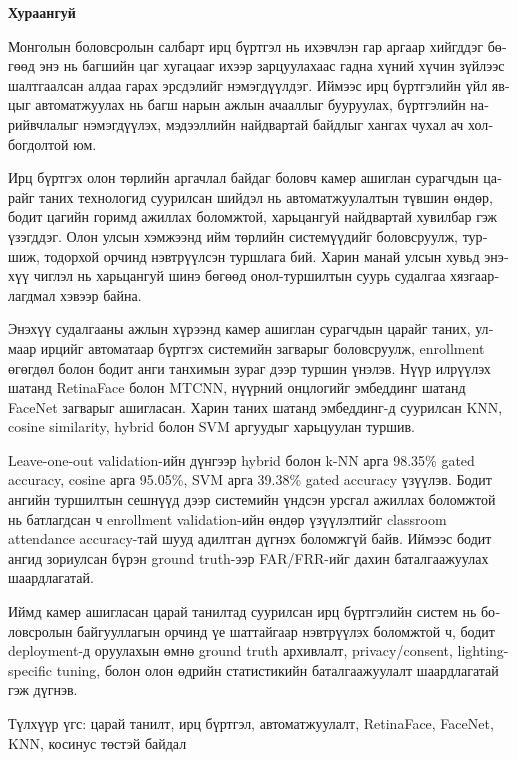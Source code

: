 \begin{otherlanguage}{mongolian}
\begin{center}
\textbf{\large Хураангуй}
\end{center}
\begin{justify}
Монголын боловсролын салбарт ирц бүртгэл нь ихэвчлэн гар аргаар хийгддэг бөгөөд энэ нь багшийн цаг хугацааг ихээр зарцуулахаас гадна хүний хүчин зүйлээс шалтгаалсан алдаа гарах эрсдэлийг нэмэгдүүлдэг. Иймээс ирц бүртгэлийн үйл явцыг автоматжуулах нь багш нарын ажлын ачааллыг бууруулах, бүртгэлийн нарийвчлалыг нэмэгдүүлэх, мэдээллийн найдвартай байдлыг хангах чухал ач холбогдолтой юм.

Ирц бүртгэх олон төрлийн аргачлал байдаг боловч камер ашиглан сурагчдын царайг таних технологид суурилсан шийдэл нь автоматжуулалтын түвшин өндөр, бодит цагийн горимд ажиллах боломжтой, харьцангуй найдвартай хувилбар гэж үзэгддэг. Олон улсын хэмжээнд ийм төрлийн системүүдийг боловсруулж, туршиж, тодорхой орчинд нэвтрүүлсэн туршлага бий. Харин манай улсын хувьд энэхүү чиглэл нь харьцангуй шинэ бөгөөд онол-туршилтын суурь судалгаа хязгаарлагдмал хэвээр байна.

Энэхүү судалгааны ажлын хүрээнд камер ашиглан сурагчдын царайг таних, улмаар ирцийг автоматаар бүртгэх системийн загварыг боловсруулж, enrollment өгөгдөл болон бодит анги танхимын зураг дээр туршин үнэлэв. Нүүр илрүүлэх шатанд RetinaFace болон MTCNN, нүүрний онцлогийг эмбеддинг шатанд FaceNet загварыг ашигласан. Харин таних шатанд эмбеддинг-д суурилсан KNN, cosine similarity, hybrid болон SVM аргуудыг харьцуулан туршив.

Leave-one-out validation-ийн дүнгээр hybrid болон k-NN арга 98.35\% gated accuracy, cosine арга 95.05\%, SVM арга 39.38\% gated accuracy үзүүлэв. Бодит ангийн туршилтын сешнүүд дээр системийн үндсэн урсгал ажиллах боломжтой нь батлагдсан ч enrollment validation-ийн өндөр үзүүлэлтийг classroom attendance accuracy-тай шууд адилтган дүгнэх боломжгүй байв. Иймээс бодит ангид зориулсан бүрэн ground truth-ээр FAR/FRR-ийг дахин баталгаажуулах шаардлагатай.

Иймд камер ашигласан царай танилтад суурилсан ирц бүртгэлийн систем нь боловсролын байгууллагын орчинд үе шаттайгаар нэвтрүүлэх боломжтой ч, бодит deployment-д оруулахын өмнө ground truth архивлалт, privacy/consent, lighting-specific tuning, болон олон өдрийн статистикийн баталгаажуулалт шаардлагатай гэж дүгнэв.

Түлхүүр үгс: царай танилт, ирц бүртгэл, автоматжуулалт, RetinaFace, FaceNet, KNN, косинус төстэй байдал
\end{justify}
\end{otherlanguage}

\medskip
